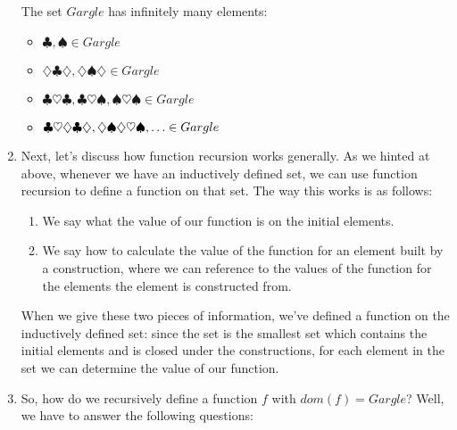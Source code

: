\begin{enumerate}[{\thesection}.1]
\begin{enumerate}[1.]
\begin{enumerate}[(i)]
				\end{enumerate}

			
			\end{enumerate}
		
				The set $Gargle$ has infinitely many elements:
				
				\begin{itemize}
				
					\item $\clubsuit,\spadesuit\in Gargle$
					
					\item $\diamondsuit\clubsuit\diamondsuit,\diamondsuit\spadesuit\diamondsuit\in Gargle$
					
					\item $\clubsuit\heartsuit\clubsuit, \clubsuit\heartsuit\spadesuit, \spadesuit\heartsuit\spadesuit\in Gargle$
				
					\item $\clubsuit\heartsuit\diamondsuit\clubsuit\diamondsuit, \diamondsuit\spadesuit\diamondsuit\heartsuit\spadesuit,\mathellipsis\in Gargle$

				
				\end{itemize}			 
				
		\item Next, let's discuss how function recursion works generally. As we hinted at above, whenever we have an inductively defined set, we can use function recursion to define a function on that set. The way this works is as follows:
		
		\begin{enumerate}[1.]
		
			\item We say what the value of our function is on the initial elements.
			
			\item We say how to calculate the value of the function for an element built by a construction, where we can reference to the values of the function for the elements the element is constructed from.
		
		\end{enumerate}

		When we give these two pieces of information, we've defined a function on the inductively defined set: since the set is the smallest set which contains the initial elements and is closed under the constructions, for each element in the set we can determine the value of our function.

		\item So, how do we recursively define a function $f$ with $dom(f)=Gargle$? Well, we have to answer the following questions:
		\begin{enumerate}[(i)]
		

\end{enumerate}
\end{enumerate}
